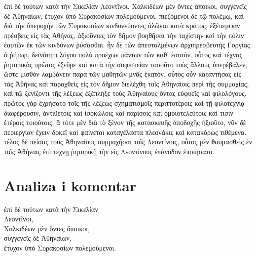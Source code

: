 {\large

\begin{greek}

\noindent ἐπὶ δὲ τούτων κατὰ τὴν Σικελίαν Λεοντῖνοι, Χαλκιδέων μὲν ὄντες ἄποικοι, συγγενεῖς δὲ Ἀθηναίων, ἔτυχον ὑπὸ Συρακοσίων πολεμούμενοι. πιεζόμενοι δὲ τῷ πολέμῳ, καὶ διὰ τὴν ὑπεροχὴν τῶν Συρακοσίων κινδυνεύοντες ἁλῶναι κατὰ κράτος, ἐξέπεμψαν πρέσβεις εἰς τὰς Ἀθήνας, ἀξιοῦντες τὸν δῆμον βοηθῆσαι τὴν ταχίστην καὶ τὴν πόλιν ἑαυτῶν ἐκ τῶν κινδύνων ῥύσασθαι. ἦν δὲ τῶν ἀπεσταλμένων ἀρχιπρεσβευτὴς Γοργίας ὁ ῥήτωρ, δεινότητι λόγου πολὺ προέχων πάντων τῶν καθ' ἑαυτόν. οὗτος καὶ τέχνας ῥητορικὰς πρῶτος ἐξεῦρε καὶ κατὰ τὴν σοφιστείαν τοσοῦτο τοὺς ἄλλους ὑπερέβαλεν, ὥστε μισθὸν λαμβάνειν παρὰ τῶν μαθητῶν μνᾶς ἑκατόν. οὗτος οὖν καταντήσας εἰς τὰς Ἀθήνας καὶ παραχθεὶς εἰς τὸν δῆμον διελέχθη τοῖς Ἀθηναίοις περὶ τῆς συμμαχίας, καὶ τῷ ξενίζοντι τῆς λέξεως ἐξέπληξε τοὺς Ἀθηναίους ὄντας εὐφυεῖς καὶ φιλολόγους. πρῶτος γὰρ ἐχρήσατο τοῖς τῆς λέξεως σχηματισμοῖς περιττοτέροις καὶ τῇ φιλοτεχνίᾳ διαφέρουσιν, ἀντιθέτοις καὶ ἰσοκώλοις καὶ παρίσοις καὶ ὁμοιοτελεύτοις καί τισιν ἑτέροις τοιούτοις, ἃ τότε μὲν διὰ τὸ ξένον τῆς κατασκευῆς ἀποδοχῆς ἠξιοῦτο, νῦν δὲ περιεργίαν ἔχειν δοκεῖ καὶ φαίνεται καταγέλαστα πλεονάκις καὶ κατακόρως τιθέμενα. τέλος δὲ πείσας τοὺς Ἀθηναίους συμμαχῆσαι τοῖς Λεοντίνοις, οὗτος μὲν θαυμασθεὶς ἐν ταῖς Ἀθήναις ἐπὶ τέχνῃ ῥητορικῇ τὴν εἰς Λεοντίνους ἐπάνοδον ἐποιήσατο.

\end{greek}

}


\section*{Analiza i komentar}



{\large
\begin{greek}
\noindent ἐπὶ δὲ τούτων κατὰ τὴν Σικελίαν\\
Λεοντῖνοι,\\
\tabto{2em} Χαλκιδέων μὲν ὄντες ἄποικοι,\\
\tabto{2em} συγγενεῖς δὲ Ἀθηναίων,\\
ἔτυχον ὑπὸ Συρακοσίων πολεμούμενοι.\\

\end{greek}
}

